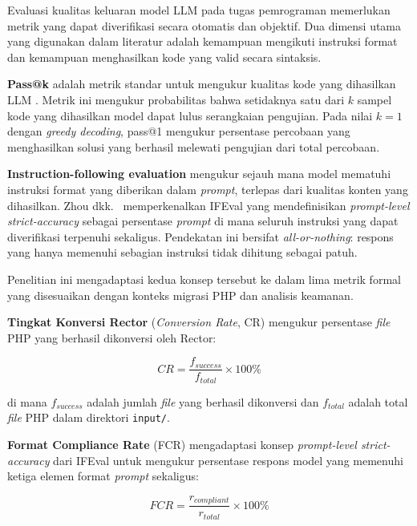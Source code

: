     Evaluasi kualitas keluaran model LLM pada tugas pemrograman memerlukan
    metrik yang dapat diverifikasi secara otomatis dan objektif. Dua dimensi
    utama yang digunakan dalam literatur adalah kemampuan mengikuti instruksi
    format dan kemampuan menghasilkan kode yang valid secara sintaksis.

    \textbf{Pass@k} adalah metrik standar untuk mengukur kualitas kode yang
    dihasilkan LLM \cite{roziere2024codellama}\cite{hui2024qwen}. Metrik ini
    mengukur probabilitas bahwa setidaknya satu dari $k$ sampel kode yang
    dihasilkan model dapat lulus serangkaian pengujian. Pada nilai $k=1$ dengan \textit{greedy decoding}, pass@1 mengukur
    persentase percobaan yang menghasilkan solusi yang berhasil melewati
    pengujian dari total percobaan.

    \textbf{Instruction-following evaluation} mengukur sejauh mana model
    mematuhi instruksi format yang diberikan dalam \textit{prompt}, terlepas
    dari kualitas konten yang dihasilkan. Zhou dkk.\ \cite{zhou2023ifeval}
    memperkenalkan IFEval yang mendefinisikan \textit{prompt-level
    strict-accuracy} sebagai persentase \textit{prompt} di mana seluruh
    instruksi yang dapat diverifikasi terpenuhi sekaligus. Pendekatan ini
    bersifat \textit{all-or-nothing}: respons yang hanya memenuhi sebagian
    instruksi tidak dihitung sebagai patuh.

    Penelitian ini mengadaptasi kedua konsep tersebut ke dalam lima metrik
    formal yang disesuaikan dengan konteks migrasi PHP dan analisis keamanan.

    \textbf{Tingkat Konversi Rector} (\textit{Conversion Rate}, CR) mengukur
    persentase \textit{file} PHP yang berhasil dikonversi oleh Rector:

    \begin{equation}
        CR = \frac{f_{success}}{f_{total}} \times 100\%
        \label{eq:cr}
    \end{equation}

    di mana $f_{success}$ adalah jumlah \textit{file} yang berhasil
    dikonversi dan $f_{total}$ adalah total \textit{file} PHP dalam
    direktori \texttt{input/}.

    \textbf{Format Compliance Rate} (FCR) mengadaptasi konsep
    \textit{prompt-level strict-accuracy} dari IFEval \cite{zhou2023ifeval}
    untuk mengukur persentase respons model yang memenuhi ketiga elemen
    format \textit{prompt} sekaligus:

    \begin{equation}
        FCR = \frac{r_{compliant}}{r_{total}} \times 100\%
        \label{eq:fcr}
    \end{equation}

